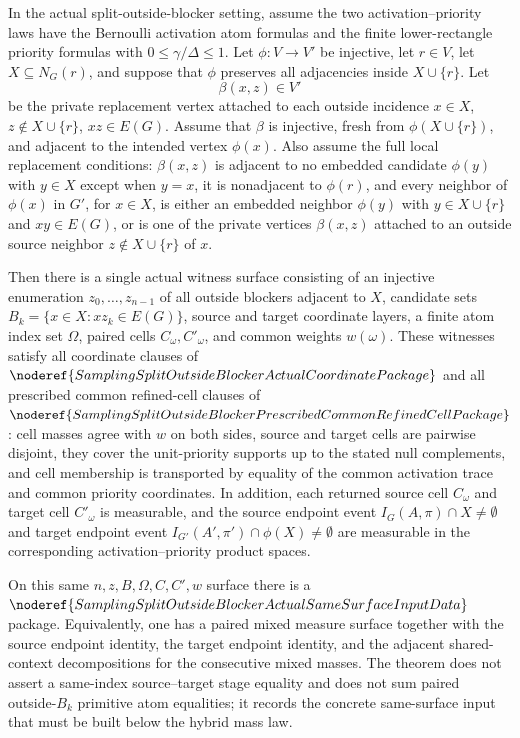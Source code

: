 \begin{helper}
In the actual split-outside-blocker setting, assume the two
activation--priority laws have the Bernoulli activation atom formulas and the
finite lower-rectangle priority formulas with
\(0\le\gamma/\Delta\le 1\).  Let \(\phi:V\to V'\) be injective, let
\(r\in V\), let \(X\subseteq N_G(r)\), and suppose that \(\phi\) preserves
all adjacencies inside \(X\cup\{r\}\).  Let
\[
  \beta(x,z)\in V'
\]
be the private replacement vertex attached to each outside incidence
\(x\in X\), \(z\notin X\cup\{r\}\), \(xz\in E(G)\).  Assume that \(\beta\) is
injective, fresh from \(\phi(X\cup\{r\})\), and adjacent to the intended
vertex \(\phi(x)\).  Also assume the full local replacement conditions:
\(\beta(x,z)\) is adjacent to no embedded candidate \(\phi(y)\) with
\(y\in X\) except when \(y=x\), it is nonadjacent to \(\phi(r)\), and every
neighbor of \(\phi(x)\) in \(G'\), for \(x\in X\), is either an embedded
neighbor \(\phi(y)\) with \(y\in X\cup\{r\}\) and \(xy\in E(G)\), or is one of
the private vertices \(\beta(x,z)\) attached to an outside source neighbor
\(z\notin X\cup\{r\}\) of \(x\).

Then there is a single actual witness surface consisting of an injective
enumeration \(z_0,\ldots,z_{n-1}\) of all outside blockers adjacent to
\(X\), candidate sets \(B_k=\{x\in X:xz_k\in E(G)\}\), source and target
coordinate layers, a finite atom index set \(\Omega\), paired cells
\(C_\omega,C'_\omega\), and common weights \(w(\omega)\).  These witnesses
satisfy all coordinate clauses of
\(\noderef{SamplingSplitOutsideBlockerActualCoordinatePackage}\) and all
prescribed common refined-cell clauses of
\(\noderef{SamplingSplitOutsideBlockerPrescribedCommonRefinedCellPackage}\):
cell masses agree with \(w\) on both sides, source and target cells are
pairwise disjoint, they cover the unit-priority supports up to the stated null
complements, and cell membership is transported by equality of the common
activation trace and common priority coordinates.  In addition, each returned
source cell \(C_\omega\) and target cell \(C'_\omega\) is measurable, and the
source endpoint event \(I_G(A,\pi)\cap X\ne\emptyset\) and target endpoint
event \(I_{G'}(A',\pi')\cap\phi(X)\ne\emptyset\) are measurable in the
corresponding activation--priority product spaces.

On this same \(n,z,B,\Omega,C,C',w\) surface there is a
\(\noderef{SamplingSplitOutsideBlockerActualSameSurfaceInputData}\) package.
Equivalently, one has a paired mixed measure surface together with the source
endpoint identity, the target endpoint identity, and the adjacent
shared-context decompositions for the consecutive mixed masses.  The theorem
does not assert a same-index source--target stage equality and does not sum
paired outside-\(B_k\) primitive atom equalities; it records the concrete
same-surface input that must be built below the hybrid mass law.
\end{helper}
